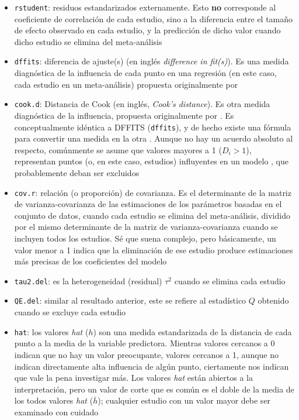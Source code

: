\documentclass[
  bookmarksnumbered]{article}
\begin{document}
\begin{itemize}
\item
  \texttt{rstudent}: residuos estandarizados externamente. Esto \textbf{no} corresponde al coeficiente de correlación de cada estudio, sino a la diferencia entre el tamaño de efecto observado en cada estudio, y la predicción de dicho valor cuando dicho estudio se elimina del meta-análisis
\item
  \texttt{dffits}: diferencia de ajuste(s) (en inglés \emph{difference in fit(s)}). Es una medida diagnóstica de la influencia de cada punto en una regresión (en este caso, cada estudio en un meta-análisis) propuesta originalmente por \textcite{belsleyRegressionDiagnosticsIdentifying1980}
\item
  \texttt{cook.d}: Distancia de Cook (en inglés, \emph{Cook's distance}). Es otra medida diagnóstica de la influencia, propuesta originalmente por \textcite{cookDetectionInfluentialObservation1977}. Es conceptualmente idéntica a DFFITS (\texttt{dffits}), y de hecho existe una fórmula para convertir una medida en la otra \autocite{Henry2003}. Aunque no hay un acuerdo absoluto al respecto, comúnmente se asume que valores mayores a 1 (\(D_{i} > 1\)), representan puntos (o, en este caso, estudios) influyentes en un modelo \autocite{cookResidualsInfluenceRegression1982}, que probablemente deban ser excluidos
\item
  \texttt{cov.r}: relación (o proporción) de covarianza. Es el determinante de la matriz de varianza-covarianza de las estimaciones de los parámetros basadas en el conjunto de datos, cuando cada estudio se elimina del meta-análisis, dividido por el mismo determinante de la matriz de varianza-covarianza cuando se incluyen todos los estudios. Sé que suena complejo, pero básicamente, un valor menor a 1 indica que la eliminación de ese estudio produce estimaciones más precisas de los coeficientes del modelo
\item
  \texttt{tau2.del}: es la heterogeneidad (residual) \(\tau^2\) cuando se elimina cada estudio
\item
  \texttt{QE.del}: similar al resultado anterior, este se refiere al estadístico \(Q\) obtenido cuando se excluye cada estudio
\item
  \texttt{hat}: los valores \emph{hat} (\(h\)) son una medida estandarizada de la distancia de cada punto a la media de la variable predictora. Mientras valores cercanos a 0 indican que no hay un valor preocupante, valores cercanos a 1, aunque no indican directamente alta influencia de algún punto, ciertamente nos indican que vale la pena investigar más. Los valores \emph{hat} están abiertos a la interpretación, pero un valor de corte que es común es el doble de la media de los todos valores \emph{hat} (\(\overline{h}\)); cualquier estudio con un valor mayor debe ser examinado con cuidado

\end{itemize}
\end{document}
